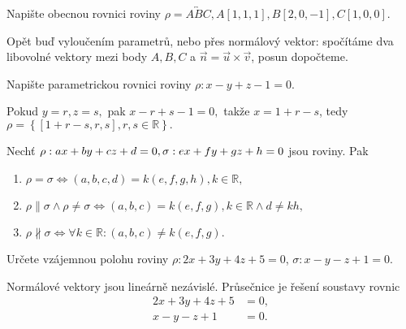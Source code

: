 \begin{priklad}
Napište obecnou rovnici roviny $\rho = \overleftrightarrow{ABC}, A[1,1,1], B[2,0,-1], C[1,0,0].$
\end{priklad}

\begin{reseni}
Opět buď vyloučením parametrů, nebo přes normálový vektor: spočítáme dva libovolné vektory
mezi body $A,B,C$ a $\vec n = \vec u \times \vec v$, posun dopočteme.
\end{reseni}

\begin{priklad}
Napište parametrickou rovnici roviny $\rho: x-y+z-1=0.$
\end{priklad}

\begin{reseni}
Pokud $y=r, z=s,$ pak $x-r+s-1=0,$ takže $x=1+r-s$, tedy $\rho = \left \{ [1+r-s,r,s],r,s\in \mathbb R \right \}. $
\end{reseni}

\begin{veta}
    Nechť $\rho: ax+by+cz\linebreak+ d=0, \sigma: ex+fy+gz+h=0$ jsou roviny. Pak
    \begin{enumerate}[$i.$]
    \item $\rho = \sigma \iff (a,b,c,d) = k(e,f,g,h), k\in \mathbb R,$
   	\item $\rho \parallel \sigma \land \rho \ne \sigma \iff (a,b,c) = k(e,f,g), k\in \mathbb R
    \land d\ne kh,$
   	\item $\rho \nparallel \sigma \iff \forall k \in \mathbb R: (a,b,c) \ne k(e,f,g)$.
    \end{enumerate}
\end{veta}

\begin{priklad}
Určete vzájemnou polohu roviny $\rho:2x+3y+4z+5=0$, $\sigma: x-y-z+1=0$.
\end{priklad}

\begin{reseni}
Normálové vektory jsou lineárně nezávislé. Průsečnice je řešení soustavy rovnic
\begin{align*}
    2x+3y+4z+5& =0,\\
    x-y-z+1&=0.
\end{align*}
\end{reseni}

